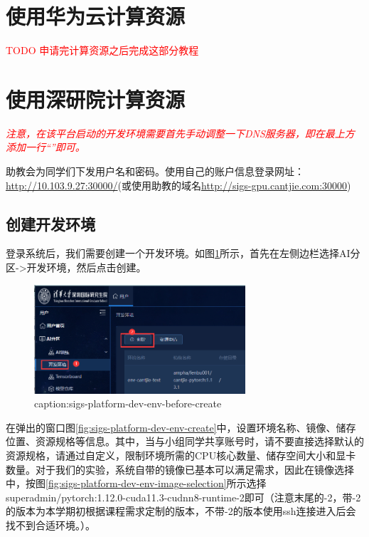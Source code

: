 \section{使用华为云计算资源}\label{sec:huawei-cloud-usage}
\textcolor{red}{TODO 申请完计算资源之后完成这部分教程}


\section{使用深研院计算资源}

\textcolor{red}{\emph{注意，在该平台启动的开发环境需要首先手动调整一下DNS服务器，即在最上方添加一行“”即可。}}

助教会为同学们下发用户名和密码。使用自己的账户信息登录网址：\url{http://10.103.9.27:30000/}(或使用助教的域名\url{http://sigs-gpu.cantjie.com:30000})

\subsection{创建开发环境}

登录系统后，我们需要创建一个开发环境。如图\ref{fig:sigs-platform-dev-env-before-create}所示，首先在左侧边栏选择AI分区->开发环境，然后点击创建。

\begin{figure}[htbp]
	\centering
	\includegraphics[width=0.7\textwidth]{figures/sigs-platform-dev-env-before-create.png}
	\caption{caption:sigs-platform-dev-env-before-create}
	\label{fig:sigs-platform-dev-env-before-create}
\end{figure}

在弹出的窗口图\ref{fig:sigs-platform-dev-env-create}中，设置环境名称、镜像、储存位置、资源规格等信息。其中，当与小组同学共享账号时，请不要直接选择默认的资源规格，请通过自定义，限制环境所需的CPU核心数量、储存空间大小和显卡数量。对于我们的实验，系统自带的镜像已基本可以满足需求，因此在镜像选择中，按图\ref{fig:sigs-platform-dev-env-image-selection}所示选择superadmin/pytorch:1.12.0-cuda11.3-cudnn8-runtime-2即可（注意末尾的-2，带-2的版本为本学期初根据课程需求定制的版本，不带-2的版本使用ssh连接进入后会找不到合适环境。）。

